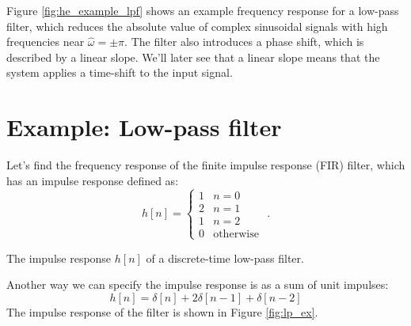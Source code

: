 Figure \ref{fig:he_example_lpf} shows an example frequency response
for a low-pass filter, which reduces the absolute value of complex
sinusoidal signals with high frequencies near
$\hat{\omega}=\pm \pi$. The filter also introduces a phase shift,
which is described by a linear slope. We'll later see that a linear
slope means that the system applies a time-shift to the input signal.

\section{Example: Low-pass filter}

Let's find the frequency response of the finite impulse response (FIR)
filter, which has an impulse response defined as:
\begin{equation}
h[n] = \left\{\begin{array}{cc}
1 & n=0\\
2 & n=1\\
1 & n=2\\
0 & \mathrm{otherwise}
\end{array} \,\,.
\right.
\end{equation}
\begin{marginfigure}
\begin{center}
\end{center}
\caption{The impulse response $h[n]$ of a discrete-time low-pass filter.}
\label{fig:lp_ex}
\end{marginfigure}
\noindent Another way we can specify the impulse response is as a sum of unit impulses:
\begin{equation}
h[n] = \delta[n] + 2\delta[n-1] + \delta[n-2]
\end{equation}
The impulse response of the filter is shown in Figure \ref{fig:lp_ex}.

